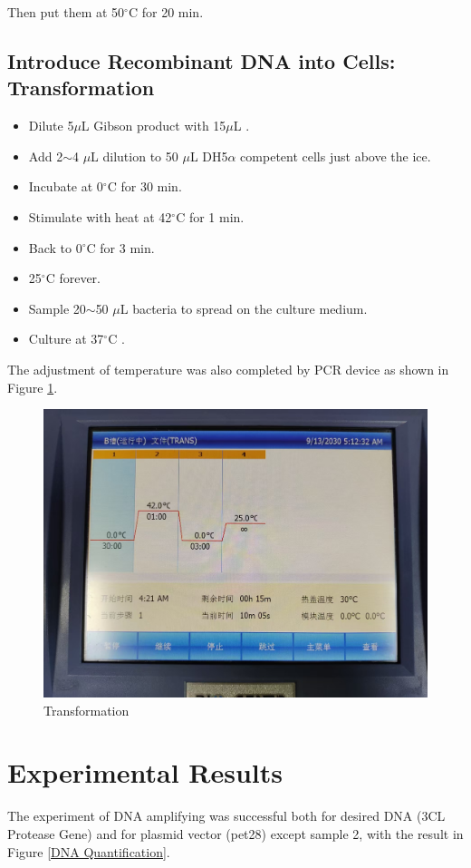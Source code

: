 \documentclass{article}
\begin{document}
Then put them at 50$^\circ$C for 20 min.
\subsection{Introduce Recombinant DNA into Cells: Transformation}
\begin{itemize}
    \item Dilute 5$\mu$L Gibson product with 15$\mu$L .
    \item  Add 2$\sim$4 $\mu$L dilution to 50 $\mu$L DH5$\alpha$ competent cells just above the ice.
    \item Incubate at 0$^\circ$C  for 30 min.
    \item Stimulate with heat at 42$^\circ$C  for 1 min.
    \item Back to 0$^\circ$C  for 3 min.
    \item 25$^\circ$C  forever.
    \item Sample 20$\sim $50 $\mu$L bacteria to spread on the culture medium.
    \item Culture at 37$^\circ$C .


\end{itemize}
The adjustment of temperature was also completed  by PCR device as shown in Figure \ref{Transformation}.
\begin{figure}
    \centering
    \includegraphics[width=0.75\linewidth]{../Figures/Gibson Assembly.jpg}
    \caption{Transformation}
    \label{Transformation}
\end{figure}
\section{Experimental Results}
The experiment of DNA amplifying was successful both for desired DNA (3CL Protease Gene) and for plasmid vector (pet28) except sample 2, with the result in Figure \ref{DNA Quantification}.
\end{document}
